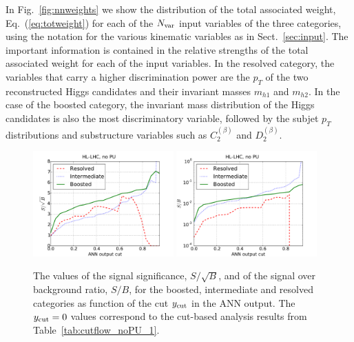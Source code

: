 %
In Fig.~\ref{fig:nnweights} we show
the distribution of the total associated weight,
Eq.~(\ref{eq:totweight}) for each of the $N_{\rm var}$ input
variables of the three categories, using the
notation for the various kinematic variables
as in Sect.~\ref{sec:input}.
%
The important information
is contained in the relative strengths of the total associated weight
for each of the input variables.
%
In the 
resolved category, the variables that carry 
a higher discrimination power
are the $p_T$ of the two reconstructed Higgs candidates and
their invariant masses $m_{h1}$ and $m_{h2}$.
%
In the case of the boosted category, the invariant mass distribution
of the Higgs candidates is also the most discriminatory
variable, followed by the subjet $p_T$ distributions and
substructure variables such as $C_2^{(\beta)}$ and
$D_2^{(\beta)}$.




\begin{figure}[t]
\begin{center}
\includegraphics[width=0.48\textwidth]{plots/ssb_noPU.pdf}
\includegraphics[width=0.48\textwidth]{plots/sb_noPU.pdf}
\caption{\small
  The values of the signal significance, $S/\sqrt{B}$, and of the
  signal over background ratio, $S/B$, for the boosted, intermediate
  and resolved categories as  function of the cut
  $y_{\rm cut}$ in the ANN output.
  The $y_{\rm cut}=0$
  values correspond to the  cut-based analysis
  results from Table~\ref{tab:cutflow_noPU_1}.
}
\label{fig:sb_mva}
\end{center}
\end{figure}

